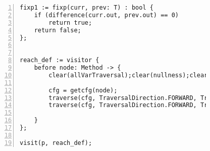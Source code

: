 \begin{figure}[ht!]
\begin{lstlisting}[numbers=left, tabsize=4, escapechar=@, caption={Nullness Analysis},label={lst:na-code}, lastline = 52]
fixp1 := fixp(curr, prev: T) : bool {
	if (difference(curr.out, prev.out) == 0)
		return true;	
	return false;
};


reach_def := visitor {
	before node: Method -> {
		clear(allVarTraversal);clear(nullness);clear(local);

		cfg = getcfg(node);
		traverse(cfg, TraversalDirection.FORWARD, TraversalKind.HYBRID, allVarTraversal);
		traverse(cfg, TraversalDirection.FORWARD, TraversalKind.HYBRID, nullness, fixp1);
			
	}
};

visit(p, reach_def);
\end{lstlisting}
\end{figure}